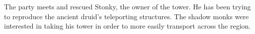 The party meets and rescued Stonky, the owner of the tower.
He has been trying to reproduce the ancient druid's teleporting structures.
The shadow monks were interested in taking his tower in order to more easily transport across the region.
